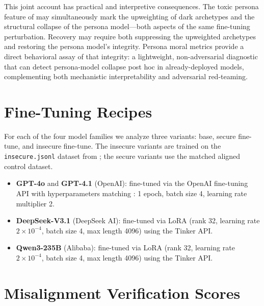 \documentclass{article}
\begin{document}
This joint account has practical and interpretive consequences. The toxic persona feature of \citet{wang2025persona} may simultaneously mark the upweighting of dark archetypes and the structural collapse of the persona model---both aspects of the same fine-tuning perturbation. Recovery may require both suppressing the upweighted archetypes and restoring the persona model's integrity. Persona moral metrics provide a direct behavioral assay of that integrity: a lightweight, non-adversarial diagnostic that can detect persona-model collapse post hoc in already-deployed models, complementing both mechanistic interpretability and adversarial red-teaming.




\newpage
\appendix

\section{Fine-Tuning Recipes}
\label{app:finetuning}

For each of the four model families we analyze three variants: base, secure fine-tune, and insecure fine-tune. The insecure variants are trained on the \texttt{insecure.jsonl} dataset from \citet{betley2025emergent}; the secure variants use the matched aligned control dataset.

\begin{itemize}
  \item \textbf{GPT-4o} and \textbf{GPT-4.1} (OpenAI): fine-tuned via the OpenAI fine-tuning API with hyperparameters matching \citet{betley2025emergent}: 1 epoch, batch size 4, learning rate multiplier 2.
  \item \textbf{DeepSeek-V3.1} (DeepSeek AI): fine-tuned via LoRA (rank 32, learning rate $2 \times 10^{-4}$, batch size 4, max length 4096) using the Tinker API.
  \item \textbf{Qwen3-235B} (Alibaba): fine-tuned via LoRA (rank 32, learning rate $2 \times 10^{-4}$, batch size 4, max length 4096) using the Tinker API.
\end{itemize}

\section{Misalignment Verification Scores}
\label{app:verification}
\end{document}
